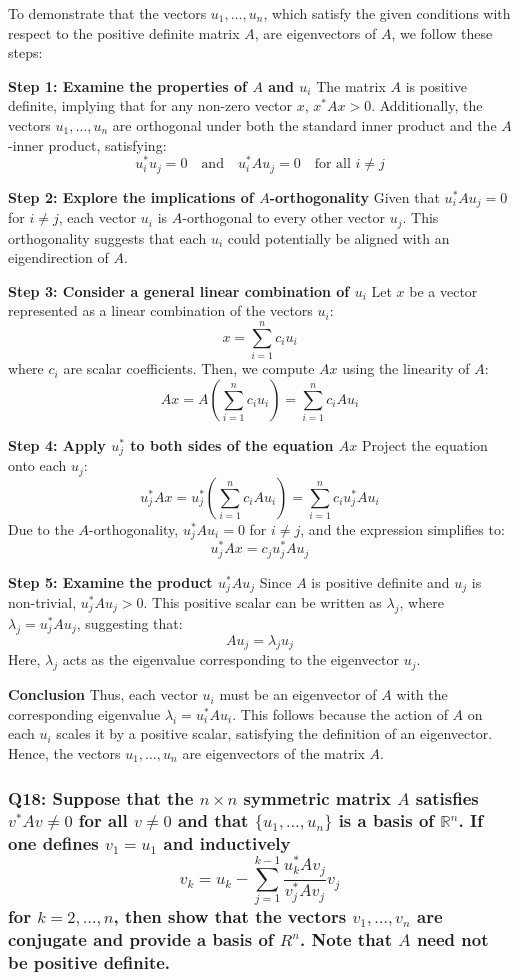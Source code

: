\documentclass[8pt]{article}
\begin{document}
To demonstrate that the vectors \(u_1, \ldots, u_n\), which satisfy the given conditions with respect to the positive definite matrix \(A\), are eigenvectors of \(A\), we follow these steps:

\textbf{Step 1: Examine the properties of \(A\) and \(u_i\)}
The matrix \(A\) is positive definite, implying that for any non-zero vector \(x\), \(x^* Ax > 0\). Additionally, the vectors \(u_1, \ldots, u_n\) are orthogonal under both the standard inner product and the \(A\)-inner product, satisfying:
\[ u_i^* u_j = 0 \quad \text{and} \quad u_i^* A u_j = 0 \quad \text{for all } i \neq j \]

\textbf{Step 2: Explore the implications of \(A\)-orthogonality}
Given that \(u_i^* A u_j = 0\) for \(i \neq j\), each vector \(u_i\) is \(A\)-orthogonal to every other vector \(u_j\). This orthogonality suggests that each \(u_i\) could potentially be aligned with an eigendirection of \(A\).

\textbf{Step 3: Consider a general linear combination of \(u_i\)}
Let \(x\) be a vector represented as a linear combination of the vectors \(u_i\):
\[ x = \sum_{i=1}^n c_i u_i \]
where \(c_i\) are scalar coefficients. Then, we compute \(Ax\) using the linearity of \(A\):
\[ Ax = A\left(\sum_{i=1}^n c_i u_i\right) = \sum_{i=1}^n c_i Au_i \]

\textbf{Step 4: Apply \(u_j^*\) to both sides of the equation \(Ax\)}
Project the equation onto each \(u_j\):
\[ u_j^* Ax = u_j^* \left(\sum_{i=1}^n c_i Au_i\right) = \sum_{i=1}^n c_i u_j^* Au_i \]
Due to the \(A\)-orthogonality, \(u_j^* Au_i = 0\) for \(i \neq j\), and the expression simplifies to:
\[ u_j^* Ax = c_j u_j^* Au_j \]

\textbf{Step 5: Examine the product \(u_j^* Au_j\)}
Since \(A\) is positive definite and \(u_j\) is non-trivial, \(u_j^* Au_j > 0\). This positive scalar can be written as \(\lambda_j\), where \(\lambda_j = u_j^* Au_j\), suggesting that:
\[ Au_j = \lambda_j u_j \]
Here, \(\lambda_j\) acts as the eigenvalue corresponding to the eigenvector \(u_j\).

\textbf{Conclusion}
Thus, each vector \(u_i\) must be an eigenvector of \(A\) with the corresponding eigenvalue \(\lambda_i = u_i^* Au_i\). This follows because the action of \(A\) on each \(u_i\) scales it by a positive scalar, satisfying the definition of an eigenvector. Hence, the vectors \(u_1, \ldots, u_n\) are eigenvectors of the matrix \(A\).

\subsubsection*{Q18: Suppose that the \(n \times n\) symmetric matrix \(A\) satisfies \(v^* A v \neq 0\) for all \(v \neq 0\) and that \(\{u_1, \ldots, u_n\}\) is a basis of \(\mathbb{R}^n\). If one defines \(v_1 = u_1\) and inductively
\[ v_k = u_k - \sum_{j=1}^{k-1} \frac{u_k^* A v_j}{v_j^* A v_j} v_j \]
for \(k = 2, \ldots, n\), then show that the vectors \(v_1, \ldots, v_n\) are conjugate and provide a basis of \({R}^n\). Note that \(A\) need not be positive definite.}
\end{document}
